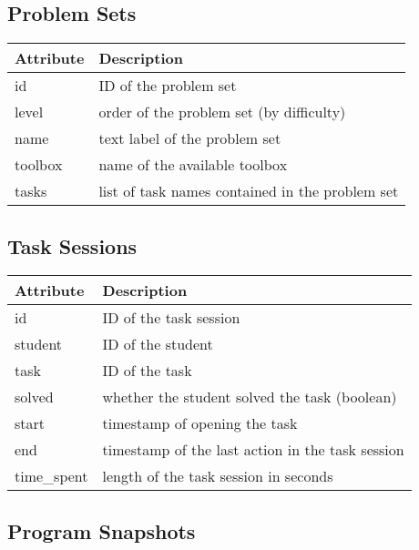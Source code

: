 
\subsection{Problem Sets}

\begin{tabular}{l l}
\toprule
Attribute & Description \\
\midrule
id & ID of the problem set \\
level & order of the problem set (by difficulty) \\
name & text label of the problem set \\
toolbox & name of the available toolbox \\
tasks & list of task names contained in the problem set \\
\bottomrule
\end{tabular}

\subsection{Task Sessions}

\begin{tabular}{l l}
\toprule
Attribute & Description \\
\midrule
id & ID of the task session \\
student & ID of the student \\
task & ID of the task \\
solved & whether the student solved the task (boolean) \\
start & timestamp of opening the task \\
end & timestamp of the last action in the task session \\
time\_spent & length of the task session in seconds \\
\bottomrule
\end{tabular}


\subsection{Program Snapshots}

